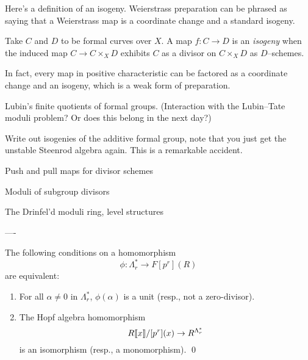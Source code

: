 

Here's a definition of an isogeny.  Weierstrass preparation can be phrased as saying that a Weierstrass map is a coordinate change and a standard isogeny.
\begin{definition}
Take $C$ and $D$ to be formal curves over $X$.  A map $f: C \to D$ is an \textit{isogeny} when the induced map $C \to C \times_X D$ exhibits $C$ as a divisor on $C \times_X D$ as $D$--schemes.
\end{definition}




In fact, every map in positive characteristic can be factored as a coordinate change and an isogeny, which is a weak form of preparation.


Lubin's finite quotients of formal groups. (Interaction with the Lubin--Tate moduli problem?  Or does this belong in the next day?)


Write out isogenies of the additive formal group, note that you just get the unstable Steenrod algebra again.  This is a remarkable accident.


Push and pull maps for divisor schemes


Moduli of subgroup divisors


The Drinfel'd moduli ring, level structures

----

\begin{lemma}
The following conditions on a homomorphism \[\phi: \Lambda_r^* \to F[p^r](R)\] are equivalent:
\begin{enumerate}
\item For all $\alpha \ne 0$ in $\Lambda_r^*$, $\phi(\alpha)$ is a unit (resp., not a zero-divisor).
\item The Hopf algebra homomorphism \[R\llbracket{x}\rrbracket / [p^r](x) \to R^{\Lambda_r^*}\] is an isomorphism (resp., a monomorphism). \qed
\end{enumerate}
\end{lemma}

